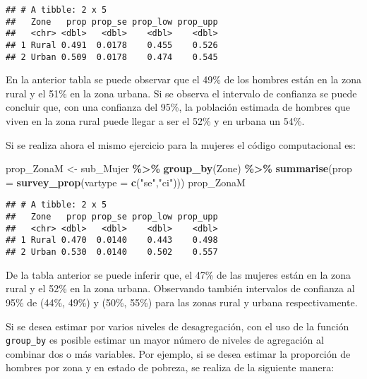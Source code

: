 \documentclass[
  12pt,
]{book}
\newenvironment{Shaded}{\begin{snugshade}}{\end{snugshade}}
\newcommand{\AttributeTok}[1]{\textcolor[rgb]{0.13,0.29,0.53}{#1}}
\newcommand{\FunctionTok}[1]{\textcolor[rgb]{0.13,0.29,0.53}{\textbf{#1}}}
\newcommand{\NormalTok}[1]{#1}
\newcommand{\OtherTok}[1]{\textcolor[rgb]{0.56,0.35,0.01}{#1}}
\newcommand{\SpecialCharTok}[1]{\textcolor[rgb]{0.81,0.36,0.00}{\textbf{#1}}}
\newcommand{\StringTok}[1]{\textcolor[rgb]{0.31,0.60,0.02}{#1}}
\begin{document}
\begin{verbatim}
## # A tibble: 2 x 5
##   Zone   prop prop_se prop_low prop_upp
##   <chr> <dbl>   <dbl>    <dbl>    <dbl>
## 1 Rural 0.491  0.0178    0.455    0.526
## 2 Urban 0.509  0.0178    0.474    0.545
\end{verbatim}

En la anterior tabla se puede observar que el 49\% de los hombres están en la zona rural y el 51\% en la zona urbana. Si se observa el intervalo de confianza se puede concluir que, con una confianza del 95\%, la población estimada de hombres que viven en la zona rural puede llegar a ser el 52\% y en urbana un 54\%.

Si se realiza ahora el mismo ejercicio para la mujeres el código computacional es:

\begin{Shaded}
\begin{Highlighting}[]
\NormalTok{prop\_ZonaM }\OtherTok{\textless{}{-}}\NormalTok{ sub\_Mujer }\SpecialCharTok{\%\textgreater{}\%} \FunctionTok{group\_by}\NormalTok{(Zone) }\SpecialCharTok{\%\textgreater{}\%} 
              \FunctionTok{summarise}\NormalTok{(}\AttributeTok{prop =} \FunctionTok{survey\_prop}\NormalTok{(}\AttributeTok{vartype =} \FunctionTok{c}\NormalTok{(}\StringTok{"se"}\NormalTok{,}\StringTok{"ci"}\NormalTok{)))}
\NormalTok{prop\_ZonaM}
\end{Highlighting}
\end{Shaded}

\begin{verbatim}
## # A tibble: 2 x 5
##   Zone   prop prop_se prop_low prop_upp
##   <chr> <dbl>   <dbl>    <dbl>    <dbl>
## 1 Rural 0.470  0.0140    0.443    0.498
## 2 Urban 0.530  0.0140    0.502    0.557
\end{verbatim}

De la tabla anterior se puede inferir que, el 47\% de las mujeres están en la zona rural y el 52\% en la zona urbana. Observando también intervalos de confianza al 95\% de (44\%, 49\%) y (50\%, 55\%) para las zonas rural y urbana respectivamente.

Si se desea estimar por varios niveles de desagregación, con el uso de la función \texttt{group\_by} es posible estimar un mayor número de niveles de agregación al combinar dos o más variables. Por ejemplo, si se desea estimar la proporción de hombres por zona y en estado de pobreza, se realiza de la siguiente manera:
\end{document}

